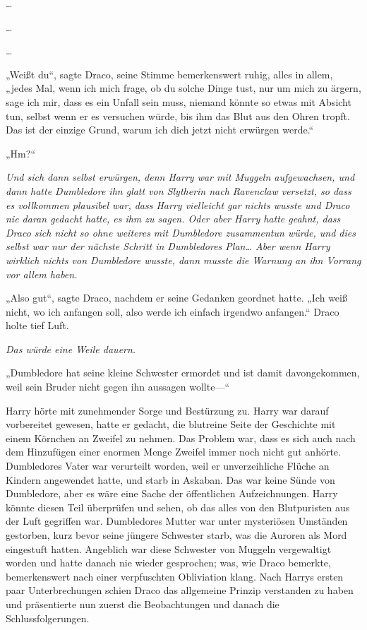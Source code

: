 {…

…

…

„Weißt du“, sagte Draco, seine Stimme bemerkenswert ruhig, alles in allem, „jedes Mal, wenn ich mich frage, ob du solche Dinge tust, nur um mich zu ärgern, sage ich mir, dass es ein Unfall sein muss, niemand könnte so etwas mit Absicht tun, selbst wenn er es versuchen würde, bis ihm das Blut aus den Ohren tropft. Das ist der einzige Grund, warum ich dich jetzt nicht erwürgen werde.“

„Hm?“

\emph{Und sich dann selbst erwürgen, denn Harry war mit Muggeln aufgewachsen, und dann hatte Dumbledore ihn glatt von Slytherin nach Ravenclaw versetzt, so dass es vollkommen plausibel war, dass Harry vielleicht gar nichts wusste und Draco nie daran gedacht hatte, es ihm zu sagen. Oder aber Harry hatte geahnt, dass Draco sich nicht so ohne weiteres mit Dumbledore zusammentun würde, und dies selbst war nur der nächste Schritt in Dumbledores Plan… Aber wenn Harry wirklich nichts von Dumbledore wusste, dann musste die Warnung an ihn Vorrang vor allem haben.}

„Also gut“, sagte Draco, nachdem er seine Gedanken geordnet hatte. „Ich weiß nicht, wo ich anfangen soll, also werde ich einfach irgendwo anfangen.“ Draco holte tief Luft.

\emph{Das würde eine Weile dauern.}

„Dumbledore hat seine kleine Schwester ermordet und ist damit davongekommen, weil sein Bruder nicht gegen ihn aussagen wollte—“

Harry hörte mit zunehmender Sorge und Bestürzung zu. Harry war darauf vorbereitet gewesen, hatte er gedacht, die blutreine Seite der Geschichte mit einem Körnchen an Zweifel zu nehmen. Das Problem war, dass es sich auch nach dem Hinzufügen einer enormen Menge Zweifel immer noch nicht gut anhörte. Dumbledores Vater war verurteilt worden, weil er unverzeihliche Flüche an Kindern angewendet hatte, und starb in Askaban. Das war keine Sünde von Dumbledore, aber es wäre eine Sache der öffentlichen Aufzeichnungen. Harry könnte diesen Teil überprüfen und sehen, ob das alles von den Blutpuristen aus der Luft gegriffen war. Dumbledores Mutter war unter mysteriösen Umständen gestorben, kurz bevor seine jüngere Schwester starb, was die Auroren als Mord eingestuft hatten. Angeblich war diese Schwester von Muggeln vergewaltigt worden und hatte danach nie wieder gesprochen; was, wie Draco bemerkte, bemerkenswert nach einer verpfuschten Obliviation klang. Nach Harrys ersten paar Unterbrechungen schien Draco das allgemeine Prinzip verstanden zu haben und präsentierte nun zuerst die Beobachtungen und danach die Schlussfolgerungen.

}

